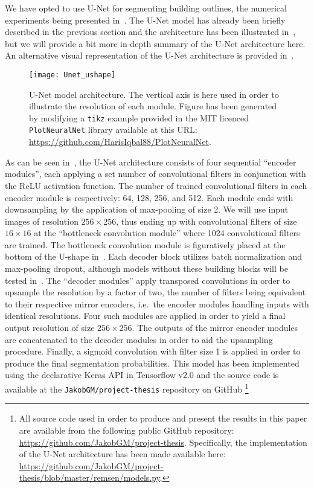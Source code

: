 We have opted to use U-Net for segmenting building outlines, the numerical experiments being presented in~.
The U-Net model has already been briefly described in the previous section and the architecture has been illustrated in~, but we will provide a bit more in-depth summary of the U-Net architecture here.
An alternative visual representation of the U-Net architecture is provided in~.

\begin{figure}[htb]
  \texttt{[image: Unet\_ushape]}
  \caption{%
    U-Net model architecture.
    The vertical axis is here used in order to illustrate the resolution of each module.
    Figure has been generated by modifying a \texttt{tikz} example provided in the MIT licenced \texttt{PlotNeuralNet} library available at this URL:\@
    \protect\url{https://github.com/HarisIqbal88/PlotNeuralNet}.
  }%
  \label{fig:unet2}
\end{figure}

As can be seen in~, the U-Net architecture consists of four sequential \enquote{encoder modules}, each applying a set number of convolutional filters in conjunction with the ReLU activation function.
The number of trained convolutional filters in each encoder module is respectively: 64, 128, 256, and 512.
Each module ends with downsampling by the application of max-pooling of size 2.
We will use input images of resolution $256 \times 256$, thus ending up with convolutional filters of size $16 \times 16$ at the \enquote{bottleneck convolution module} where 1024 convolutional filters are trained.
The bottleneck convolution module is figuratively placed at the bottom of the U-shape in~.
Each decoder block utilizes batch normalization and max-pooling dropout, although models without these building blocks will be tested in~.
The \enquote{decoder modules} apply transposed convolutions in order to upsample the resolution by a factor of two, the number of filters being equivalent to their respective mirror encoders, i.e.\ the encoder modules handling inputs with identical resolutions.
Four such modules are applied in order to yield a final output resolution of size $256 \times 256$.
The outputs of the mirror encoder modules are concatenated to the decoder modules in order to aid the upsampling procedure.
Finally, a sigmoid convolution with filter size \num{1} is applied in order to produce the final segmentation probabilities.
This model has been implemented using the declarative Keras API in Tensorflow v2.0 and the source code is available at the \texttt{JakobGM/project-thesis} repository on GitHub%
\footnote{%
  All source code used in order to produce and present the results in this paper are available from the following public GitHub repository: \url{https://github.com/JakobGM/project-thesis}.
  Specifically, the implementation of the U-Net architecture has been made available here: \url{https://github.com/JakobGM/project-thesis/blob/master/remsen/models.py}.
}
